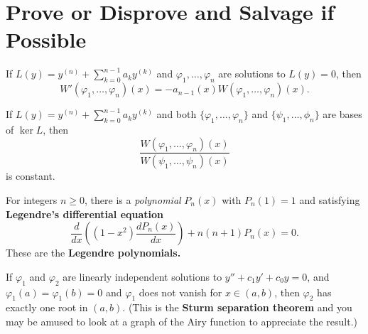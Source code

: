 \documentclass{homework}
\begin{document}
\section{Prove or Disprove and Salvage if Possible}

\begin{problem}
  If $L(y) = y^{(n)} + \sum_{k=0}^{n-1} a_k y^{(k)}$ and $\varphi_1,\ldots,\varphi_n$ are solutions to $L(y) = 0$, then
  \[
    W'(\varphi_1,\ldots,\varphi_n)(x) = - a_{n-1}(x) W(\varphi_1,\ldots,\varphi_n)(x).
  \]
\end{problem}

\begin{problem}
  If $L(y) = y^{(n)} + \sum_{k=0}^{n-1} a_k y^{(k)}$ and 
  both $\{\varphi_1,\ldots,\varphi_n\}$ and $\{\psi_1,\ldots,\phi_n\}$ are bases of $\ker L$, then
  \[
    \frac{W(\varphi_1,\ldots,\varphi_n)(x)}{W(\psi_1,\ldots,\psi_n)(x)}
  \]
  is constant.
\end{problem}

\begin{problem}\label{legendre-polynomials}For integers $n \geq 0$, there is a \textit{polynomial} $P_n(x)$ with $P_{n}(1)=1$ and satisfying
  \textbf{Legendre's differential equation}
  \[
    \frac{d}{dx}\left(\left(1-x^{2}\right){\frac {d P_{n}(x)}{dx}}\right)+n(n+1)P_{n}(x)=0.
  \]
  These are the \textbf{Legendre polynomials.}
\end{problem}


\begin{problem}\label{sturm-separation}If $\varphi_1$ and $\varphi_2$ are linearly independent solutions to
  $y'' + c_1 y' + c_0 y = 0$, and $\varphi_1(a) = \varphi_1(b) = 0$
  and $\varphi_1$ does not vanish for $x \in (a,b)$, then $\varphi_2$
  has exactly one root in $(a,b)$.  (This is the \textbf{Sturm
    separation theorem} and you may be amused to look at a graph of
  the Airy function to appreciate the result.)
\end{problem}
\end{document}
